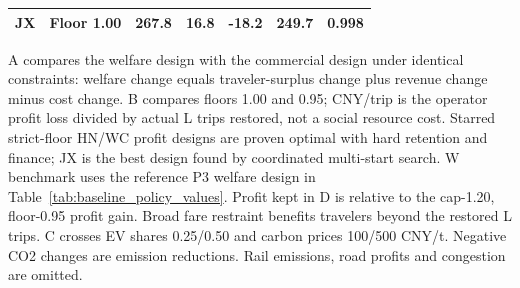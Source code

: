 \begin{table}[htbp]
\begin{minipage}{.95\textwidth}
\begin{tabular*}{\linewidth}{@{\extracolsep{\fill}}llrrrrr@{}}
JX & Floor 1.00 & 267.8 & 16.8 & -18.2 & 249.7 & 0.998 \\
\bottomrule\end{tabular*}\par\medskip
\par\noindent\fontsize{8}{9.5}\selectfont A compares the welfare design with the commercial design under identical constraints: welfare change equals traveler-surplus change plus revenue change minus cost change. B compares floors 1.00 and 0.95; CNY/trip is the operator profit loss divided by actual L trips restored, not a social resource cost. Starred strict-floor HN/WC profit designs are proven optimal with hard retention and finance; JX is the best design found by coordinated multi-start search. W benchmark uses the reference P3 welfare design in Table~\ref{tab:baseline_policy_values}. Profit kept in D is relative to the cap-1.20, floor-0.95 profit gain. Broad fare restraint benefits travelers beyond the restored L trips. C crosses EV shares 0.25/0.50 and carbon prices 100/500 CNY/t. Negative CO2 changes are emission reductions. Rail emissions, road profits and congestion are omitted.
\end{minipage}\end{table}
